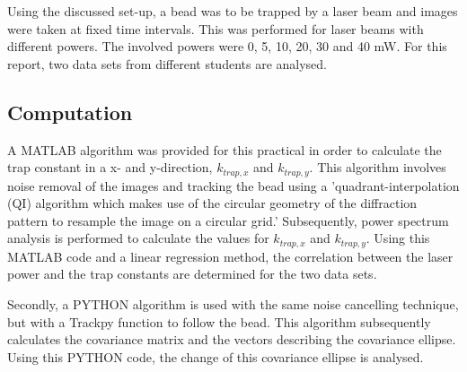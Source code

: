 Using the discussed set-up, a bead was to be trapped by a laser beam and images were taken at fixed time intervals. This was performed for laser beams with different powers. The involved powers were 0, 5, 10, 20, 30 and 40 mW. For this report, two data sets from different students are analysed.

\subsection{Computation}

A MATLAB algorithm was provided for this practical in order to calculate the trap constant in a x- and y-direction, $k_{trap,x}$ and $k_{trap,y}$. This algorithm involves noise removal of the images and tracking the bead using a 'quadrant-interpolation (QI) algorithm  which makes use of the circular geometry of the diffraction pattern to resample the image on a circular grid.' \cite{loenhout} Subsequently, power spectrum analysis is performed to calculate the values for $k_{trap,x}$ and $k_{trap,y}$. Using this MATLAB code and a linear regression method, the correlation between the laser power and the trap constants are determined for the two data sets.

Secondly, a PYTHON algorithm is used with the same noise cancelling technique, but with a Trackpy function to follow the bead. This algorithm subsequently calculates the covariance matrix and the vectors describing the covariance ellipse. Using this PYTHON code, the change of this covariance ellipse is analysed. 




